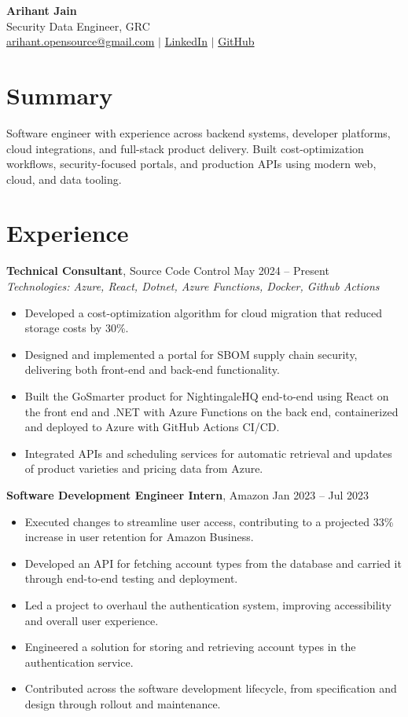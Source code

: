 \documentclass[11pt,a4paper]{article}
\begin{document}
\begin{center}
{\LARGE \textbf{Arihant Jain}}
\\ Security Data Engineer, GRC
\\ \href{mailto:arihant.opensource@gmail.com}{arihant.opensource@gmail.com} $\mid$ \href{https://linkedin.com/in/arihantjain1208}{LinkedIn} $\mid$ \href{https://github.com/Arihant1208}{GitHub}
\end{center}

\section{Summary}
Software engineer with experience across backend systems, developer platforms, cloud integrations, and full-stack product delivery. Built cost-optimization workflows, security-focused portals, and production APIs using modern web, cloud, and data tooling.

\section{Experience}
\textbf{Technical Consultant}, Source Code Control \hfill May 2024 -- Present
\\ \textit{Technologies: Azure, React, Dotnet, Azure Functions, Docker, Github Actions}
\begin{itemize}
  \item Developed a cost-optimization algorithm for cloud migration that reduced storage costs by 30\%.
  \item Designed and implemented a portal for SBOM supply chain security, delivering both front-end and back-end functionality.
  \item Built the GoSmarter product for NightingaleHQ end-to-end using React on the front end and .NET with Azure Functions on the back end, containerized and deployed to Azure with GitHub Actions CI/CD.
  \item Integrated APIs and scheduling services for automatic retrieval and updates of product varieties and pricing data from Azure.
\end{itemize}
\vspace{2pt}
\textbf{Software Development Engineer Intern}, Amazon \hfill Jan 2023 -- Jul 2023
\begin{itemize}
  \item Executed changes to streamline user access, contributing to a projected 33\% increase in user retention for Amazon Business.
  \item Developed an API for fetching account types from the database and carried it through end-to-end testing and deployment.
  \item Led a project to overhaul the authentication system, improving accessibility and overall user experience.
  \item Engineered a solution for storing and retrieving account types in the authentication service.
  \item Contributed across the software development lifecycle, from specification and design through rollout and maintenance.
\end{itemize}
\vspace{2pt}
\end{document}
